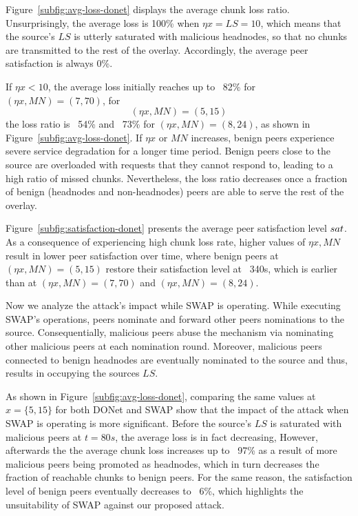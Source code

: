 Figure~\ref{subfig:avg-loss-donet} displays the average chunk loss ratio.
Unsurprisingly, the average loss is 100\% when $\eta x= LS =10$, which means that the source's $LS$ is utterly saturated with malicious headnodes, so that no chunks are transmitted to the rest of the overlay.
Accordingly, the average peer satisfaction is always 0\%. 

If $\eta x < 10$, the average loss initially reaches up to ~82\% for $(\eta x, MN)=(7, 70)$, for $$(\eta x, MN)=(5, 15)$$ the loss ratio is ~54\% and ~73\% for $(\eta x, MN)=(8, 24)$, as shown in Figure~\ref{subfig:avg-loss-donet}.
If $\eta x$ or $MN$ increases, benign peers experience severe service degradation for a longer time period. Benign peers close to the source are overloaded with requests that they cannot respond to, leading to a high ratio of missed chunks. 
Nevertheless, the loss ratio decreases once a fraction of benign (headnodes and non-headnodes) peers are able to serve the rest of the overlay.

Figure~\ref{subfig:satisfaction-donet} presents the average peer satisfaction level $sat$.
As a consequence of experiencing high chunk loss rate, higher values of $\eta x, MN$ result in lower peer satisfaction over time, where benign peers at $(\eta x, MN)=(5, 15)$ restore their satisfaction level at ~340s, which is earlier than at $(\eta x, MN)=(7, 70)$ and $(\eta x, MN)=(8, 24)$.

Now we analyze the attack's impact while SWAP is operating.
While executing SWAP's operations, peers nominate and forward other peers nominations to the source. 
Consequentially, malicious peers abuse the mechanism via nominating other malicious peers at each nomination round. 
Moreover, malicious peers connected to benign headnodes are eventually nominated to the source and thus, results in occupying the sources $LS$.

As shown in Figure~\ref{subfig:avg-loss-donet}, comparing the same values at $x=\{5, 15\}$ for both DONet and SWAP show that the impact of the attack when SWAP is operating is more significant.
Before the source's $LS$ is saturated with malicious peers at $t=80s$, the average loss is in fact decreasing, However, afterwards the the average chunk loss increases up to ~97\% as a result of more malicious peers being promoted as headnodes, which in turn decreases the fraction of reachable chunks to benign peers.
For the same reason, the satisfaction level of benign peers eventually decreases to ~6\%, which highlights the unsuitability of SWAP against our proposed attack.

